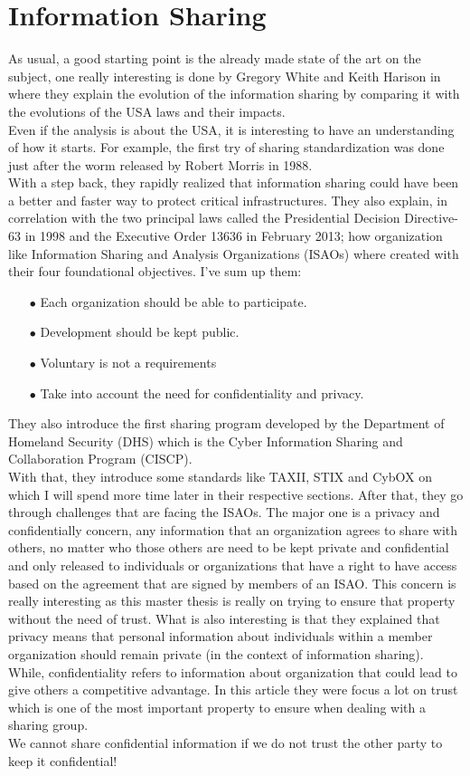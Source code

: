 \documentclass{eplmastersthesis}
\begin{document}
\section{Information Sharing}
As usual, a good starting point is the already made state of the art on the subject, one really interesting is done by Gregory White and Keith Harison in \cite{white2017state} where they explain the evolution of the information sharing by comparing it with the evolutions of the USA laws and their impacts.\\
Even if the analysis is about the USA, it is interesting to have an understanding of how it starts. For example, the first try of sharing standardization was done just after the worm released by Robert Morris in 1988.\\
With a step back, they rapidly realized that information sharing could have been a better and faster way to protect critical infrastructures. They also explain, in correlation with the two principal laws called the Presidential Decision Directive-63 in 1998 and the Executive Order 13636 in February 2013; how organization like Information Sharing and Analysis Organizations (ISAOs) where created with their four foundational objectives. I've sum up them:
\begin{itemize}
\item[$\bullet$] Each organization should be able to participate.
\item[$\bullet$] Development should be kept public.
\item[$\bullet$] Voluntary is not a requirements 
\item[$\bullet$] Take into account the need for confidentiality and privacy.
\end{itemize}
They also introduce the first sharing program developed by the Department of Homeland Security (DHS) which is the Cyber Information Sharing and Collaboration Program (CISCP).\\
With that, they introduce some standards like TAXII, STIX and CybOX on which I will spend more time later in their respective sections. After that, they go through challenges that are facing the ISAOs. The major one is a privacy and confidentially concern, any information that an organization agrees to share with others, no matter who those others are need to be kept private and confidential and only released to individuals or organizations that have a right to have access based on the agreement that are signed by members of an ISAO. This concern is really interesting as this master thesis is really on trying to ensure that property without the need of trust. What is also interesting is that they explained that privacy means that personal information about individuals within a member organization should remain private (in the context of information sharing).
While, confidentiality refers to information about organization that could lead to give others a competitive advantage.
In this article they were focus a lot on trust which is one of the most important property to ensure when dealing with a sharing group.\\
We cannot share confidential information if we do not trust the other party to keep it confidential! \\
\end{document}
